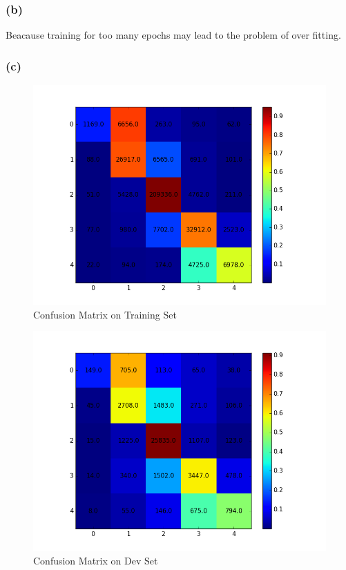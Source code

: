 \documentclass {article}
\begin{document}
\subsubsection*{(b)}
Beacause training for too many epochs may lead to the problem of over fitting.
\subsubsection*{(c)}
\begin{figure}[H]
\centering
\includegraphics[width=0.7\linewidth]{ps3_1_c_c_train}
\caption{Confusion Matrix on Training Set}
\label{fig:ps3_1_c_c_train}
\end{figure}
\begin{figure}[H]
\centering
\includegraphics[width=0.7\linewidth]{ps3_1_c_c_dev}
\caption{Confusion Matrix on Dev Set}
\label{fig:ps3_1_c_c_dev}
\end{figure}
\end{document}

